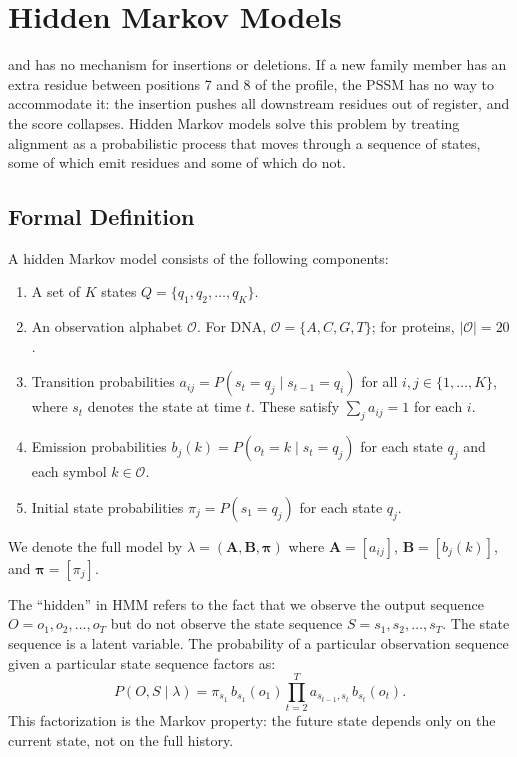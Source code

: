 \section{Hidden Markov Models}
\label{sec:hmm}

 and has no mechanism for insertions or deletions.
If a new family member has an extra residue between positions 7 and 8 of the profile, the PSSM has no way to accommodate it: the insertion pushes all downstream residues out of register, and the score collapses.
Hidden Markov models solve this problem by treating alignment as a probabilistic process that moves through a sequence of states, some of which emit residues and some of which do not.

\subsection{Formal Definition}
\label{sec:hmm-definition}

A hidden Markov model consists of the following components:
\begin{enumerate}
  \item A set of $K$ states $Q = \{q_1, q_2, \ldots, q_K\}$.
  \item An observation alphabet $\mathcal{O}$. For DNA, $\mathcal{O} = \{A, C, G, T\}$; for proteins, $|\mathcal{O}| = 20$.
  \item Transition probabilities $a_{ij} = P(s_t = q_j \mid s_{t-1} = q_i)$ for all $i, j \in \{1, \ldots, K\}$, where $s_t$ denotes the state at time $t$.  These satisfy $\sum_j a_{ij} = 1$ for each $i$.
  \item Emission probabilities $b_j(k) = P(o_t = k \mid s_t = q_j)$ for each state $q_j$ and each symbol $k \in \mathcal{O}$.
  \item Initial state probabilities $\pi_j = P(s_1 = q_j)$ for each state $q_j$.
\end{enumerate}
We denote the full model by $\lambda = (\bm{A}, \bm{B}, \bm{\pi})$ where $\bm{A} = [a_{ij}]$, $\bm{B} = [b_j(k)]$, and $\bm{\pi} = [\pi_j]$.

The ``hidden'' in HMM refers to the fact that we observe the output sequence $O = o_1, o_2, \ldots, o_T$ but do not observe the state sequence $S = s_1, s_2, \ldots, s_T$.
The state sequence is a latent variable.
The probability of a particular observation sequence given a particular state sequence factors as:
\begin{equation}
\label{eq:hmm-joint}
  P(O, S \mid \lambda) = \pi_{s_1} \, b_{s_1}(o_1) \prod_{t=2}^{T} a_{s_{t-1}, s_t} \, b_{s_t}(o_t).
\end{equation}
This factorization is the Markov property: the future state depends only on the current state, not on the full history.

